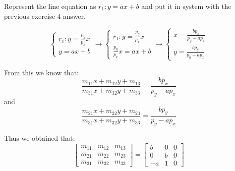 \documentclass{article}
\begin{document}
Represent the line equation as $r_1 : y = ax + b$ and put it in system with the previous exercise $4$ answer.

\begin{equation*}
    \begin{cases}
        r_1: y = \frac{p_y}{p_x} x \\
        y = ax + b
    \end{cases}
    \rightarrow
    \begin{cases}
        r_1: y = \frac{p_y}{p_x} x \\
        \frac{p_y}{p_x} x = ax + b
    \end{cases}
    \rightarrow
    \begin{cases}
        x = \frac{bp_x}{p_y - ap_x} \\
        y = \frac{bp_y}{p_y - ap_x}
    \end{cases}
\end{equation*}

From this we know that:
\[
    \frac{m_{11}x + m_{12}y + m_{13}}{m_{31}x + m_{32}y + m_{33}} = \frac{bp_x}{p_y - ap_x}
\]
and
\[
    \frac{m_{21}x + m_{22}y + m_{23}}{m_{31}x + m_{32}y + m_{33}} = \frac{bp_y}{p_y - ap_x}
\]

Thus we obtained that:
\[
    \begin{bmatrix}
        m_{11} & m_{12} & m_{13} \\
        m_{21} & m_{22} & m_{23} \\
        m_{31} & m_{32} & m_{33}
    \end{bmatrix}
    =
    \begin{bmatrix}
        b  & 0 & 0 \\
        0  & b & 0 \\
        -a & 1 & 0
    \end{bmatrix}
\]
\end{document}
